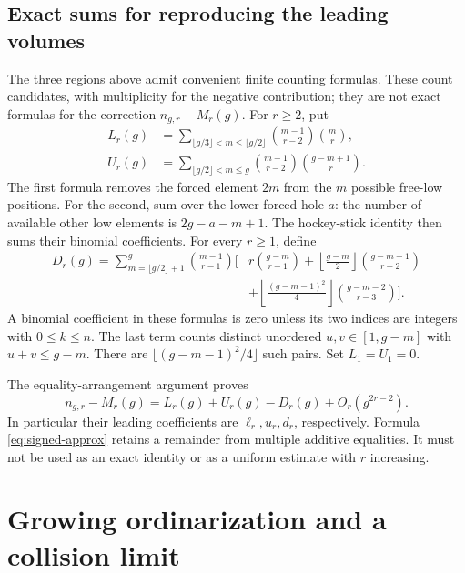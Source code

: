 \documentclass[11pt]{article}
\theoremstyle{remark}\newtheorem{remark}[theorem]{Remark}
\begin{document}
\subsection{Exact sums for reproducing the leading volumes}

The three regions above admit convenient finite counting formulas. These
count candidates, with multiplicity for the negative contribution; they
are not exact formulas for the correction $n_{g,r}-M_r(g)$. For $r\ge2$,
put
\begin{align}
L_r(g)&=\sum_{\lfloor g/3\rfloor<m\le\lfloor g/2\rfloor}
 \binom{m-1}{r-2}\binom mr,\label{eq:low-sum}\\
U_r(g)&=\sum_{\lfloor g/2\rfloor<m\le g}
 \binom{m-1}{r-2}\binom{g-m+1}{r}.\label{eq:high-sum}
\end{align}
The first formula removes the forced element $2m$ from the $m$ possible
free-low positions. For the second, sum over the lower forced hole $a$:
the number of available other low elements is $2g-a-m+1$. The
hockey-stick identity then sums their binomial coefficients.
For every $r\ge1$, define
\begin{equation}\label{eq:negative-sum}
\begin{split}
D_r(g)=\sum_{m=\lfloor g/2\rfloor+1}^{g}\binom{m-1}{r-1}
\biggl[&r\binom{g-m}{r-1}
+\left\lfloor\frac{g-m}{2}\right\rfloor\binom{g-m-1}{r-2}\\
&+\left\lfloor\frac{(g-m-1)^2}{4}\right\rfloor
 \binom{g-m-2}{r-3}\biggr].
\end{split}
\end{equation}
A binomial coefficient in these formulas is zero unless its two indices
are integers with $0\le k\le n$. The last term counts distinct unordered
$u,v\in[1,g-m]$ with $u+v\le g-m$. There are
$\lfloor(g-m-1)^2/4\rfloor$ such pairs. Set $L_1=U_1=0$.

The equality-arrangement argument proves
\begin{equation}\label{eq:signed-approx}
n_{g,r}-M_r(g)=L_r(g)+U_r(g)-D_r(g)+O_r(g^{2r-2}).
\end{equation}
In particular their leading coefficients are $\ell_r,u_r,d_r$,
respectively. Formula \eqref{eq:signed-approx} retains a remainder from
multiple additive equalities. It must not be used as an exact identity or
as a uniform estimate with $r$ increasing.

\section{Growing ordinarization and a collision limit}\label{sec:growing}
\end{document}

